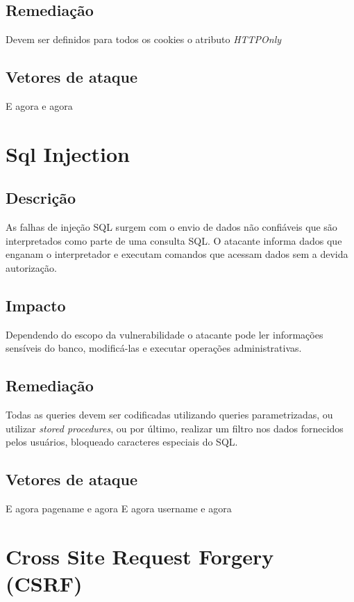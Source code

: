 \documentclass{ufscThesis}
\newcommand{\+}{\discretionary{\mbox{${\bm\cdot}\mkern-1mu$}}{}{}}
\renewcommand\+{\discretionary{}{}{}}
\begin{document}
\subsection{Remediação}

Devem ser definidos para todos os cookies o atributo \emph{HTTPOnly}

\subsection{Vetores de ataque}

E agora 
e agora
\section{Sql Injection}

\subsection{Descrição}

As falhas de injeção SQL surgem com o envio de dados não confiáveis que são interpretados como parte de uma consulta SQL. O atacante informa dados que enganam o interpretador e executam comandos que acessam dados sem a devida autorização.

\subsection{Impacto}

Dependendo do escopo da vulnerabilidade o atacante pode ler informações sensíveis do banco, modificá-las e executar operações administrativas.

\subsection{Remediação}

Todas as queries devem ser codificadas utilizando queries parametrizadas, ou utilizar \emph{stored procedures}, ou por último, realizar um filtro nos dados fornecidos pelos usuários, bloqueado caracteres especiais do SQL.

\subsection{Vetores de ataque}

E agora pagename
e agora
E agora username
e agora
\section{Cross Site Request Forgery (CSRF)}
\end{document}
